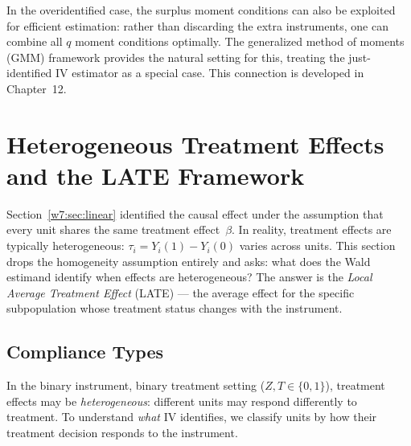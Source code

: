 \documentclass[master.tex]{subfiles}
\begin{document}
\begin{remark}
In the overidentified case, the surplus moment conditions can also
be exploited for efficient estimation: rather than discarding the
extra instruments, one can combine all $q$ moment conditions
optimally.  The generalized method of moments (GMM) framework
provides the natural setting for this, treating the just-identified
IV estimator as a special case.  This connection is developed in
Chapter~12.
\end{remark}


\section{Heterogeneous Treatment Effects and the LATE Framework}
\label{w7:sec:late}

\begin{tcolorbox}[defstyle, title={Framework 2: Heterogeneous Treatment Effects}]
Section~\ref{w7:sec:linear} identified the causal effect under the
assumption that every unit shares the same treatment effect~$\beta$.
In reality, treatment effects are typically heterogeneous:
$\tau_i = Y_i(1) - Y_i(0)$ varies across units.  This section
drops the homogeneity assumption entirely and asks: what does the
Wald estimand identify when effects are heterogeneous?  The answer
is the \emph{Local Average Treatment Effect} (LATE) --- the average
effect for the specific subpopulation whose treatment status changes
with the instrument.
\end{tcolorbox}

\subsection{Compliance Types}

In the binary instrument, binary treatment setting
($Z, T \in \{0,1\}$), treatment effects may be
\emph{heterogeneous}: different units may respond differently to
treatment.  To understand \emph{what} IV identifies, we classify
units by how their treatment decision responds to the instrument.
\end{document}
